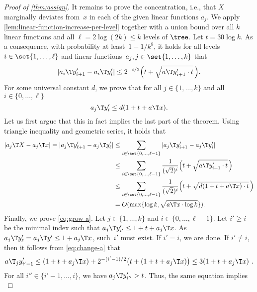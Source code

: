 \documentclass[a4paper,USenglish,cleveref,thm-restate]{lipics-v2021}
\begin{document}
\begin{proof}[Proof of \cref{thm:assign}]
    It remains to prove the concentration, i.e., that $X$ marginally deviates from~$x$ in each of the
    given linear functions $a_j$.
    We apply \cref{lem:linear-function-increase-per-level} together with a union bound over all $k$ linear functions and all $\ell = 2\log(2k) \le k$ levels of $\tree$.
    Let $t = 30\log k$.
    As a consequence, with probability at least~$1 - 1/k^8$, it holds for all levels~$i \in \set{1, \dotsc , \ell}$ and linear functions~$a_j,j\in\set{1,\dotsc,k}$ that
    \begin{equation}\label{eq:change-a}
        |a_i\T y_{i+1}' - a_i\T y_i'| \le 2^{-i/2} \Big(t + \sqrt{a\T y_{i+1}' \cdot t}\,\Big).
    \end{equation}
    For some universal constant $d$, we prove that for all $j\in\{1,\dotsc,k\}$ and all~$i\in\{0,\dotsc,\ell\}$
    \begin{equation}\label{eq:grow-a}
        a_j\T y'_i \le d (1 + t + a\T x).
    \end{equation}
    Let us first argue that this in fact implies the last part of the theorem.
    Using triangle inequality and geometric series, it holds that
    \begin{align*}
        |a_j\T X - a_j\T x| 
        = |a_j\T y'_{\ell+1} - a_j\T y'_{\ell}| 
        &\le \sum_{i \in \set{0, \dotsc, \ell-1}} |a_j\T y'_{i+1} - a_j\T y'_{i}| \\
        &\le \sum_{i \in \set{0, \dotsc, \ell-1}} \frac{1}{(\sqrt{2})^i} \Big(t + \sqrt{a\T y'_{i+1} \cdot t}\,\Big) \\
        &\le \sum_{i \in \set{0, \dotsc, \ell-1}} \frac{1}{(\sqrt{2})^i} \Big(t + \sqrt{d(1 + t + a\T x) \cdot t}\,\Big) \\
        &= O(\max\{\log k, \sqrt{a\T x \cdot \log k}\}) .
    \end{align*}
    Finally, we prove \cref{eq:grow-a}.
    Let $j\in\{1,\dotsc,k\}$
    and $i\in\{0,\dotsc,\ell-1\}$.
    Let $i' \ge i$ be the minimal index such that
    $a_j\T y'_{i'} \le 1 + t + a_j\T x$.
    As $a_j\T y'_{\ell} = a_j\T y' \le 1 + a_j\T x$, such~$i'$ must exist.
    If $i' = i$, we are done. If $i' \neq i$, then it follows from \cref{eq:change-a} that
    \begin{equation*}
        a\T_j y'_{i'-1} \le (1 + t + a_j\T x) + 2^{-(i'-1)/2}\big(t + (1 + t + a_j\T x)\big) \le 3(1 + t + a_j\T x) \ .
    \end{equation*}
    For all $i'' \in\{i'-1,\dotsc,i\}$, we have $a_j\T y'_{i''} > t$. Thus, the same equation implies
    \begin{equation*}

\end{equation*}
\end{proof}
\end{document}
